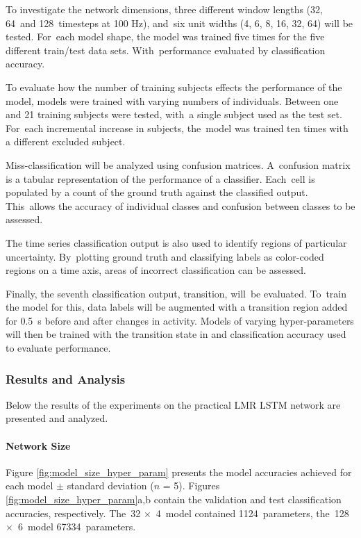 To investigate the network dimensions, three different window lengths (32, 64~and 128~timesteps at 100 Hz), and~six unit widths (4, 6, 8, 16, 32, 64) will be tested. For~each model shape, the model was trained five times for the five different train/test data sets. With~performance evaluated by classification accuracy.

To evaluate how the number of training subjects effects the performance of the model, models were trained with varying numbers of individuals. Between one and 21 training subjects were tested, with~a single subject used as the test set. For~each incremental increase in subjects, the~model was trained ten times with a different excluded subject.

Miss-classification will be analyzed using confusion matrices. A~confusion matrix is a tabular representation of the performance of a classifier. Each~cell is populated by a count of the ground truth against the classified output. This~allows the accuracy of individual classes and confusion between classes to be assessed.

The time series classification output is also used to identify regions of particular uncertainty. By~plotting ground truth and classifying labels as color-coded regions on a time axis,  areas of incorrect classification can be assessed.

Finally, the seventh classification output, transition, will~be evaluated. To~train the model for this, data labels will be augmented with a transition region added for 0.5~s before and after changes in activity. Models of varying hyper-parameters will then be trained with the transition state in and classification accuracy used to evaluate performance.

\subsubsection{Results and Analysis}
Below the results of the experiments on the practical LMR LSTM network are presented and analyzed.

\paragraph{Network Size}
Figure \ref{fig:model_size_hyper_param} presents the model accuracies achieved for each model $\pm$ standard deviation ($n$ = 5). Figures \ref{fig:model_size_hyper_param}a,b contain the validation and test classification accuracies, respectively. The~32 $\times$~4~model contained 1124~parameters, the~128 $\times$~6~model 67334~parameters.

